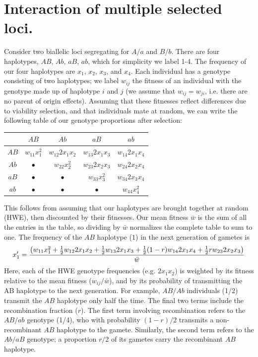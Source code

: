 \chapter{Interaction of multiple selected loci.}

Consider two biallelic loci segregating for $A/a$ and $B/b$. There are four haplotypes, $AB$, $Ab$, $aB$, $ab$, which for simplicity we label 1-4. The frequency of our four haplotypes are $x_1$, $x_2$, $x_3$, and $x_4$. Each individual has a genotype consisting of two haplotypes; we label $w_{ij}$ the fitness of an individual with the genotype made up of haplotype $i$ and $j$ (we assume that $w_{ij}=w_{ji}$, i.e. there are no parent of origin effects). Assuming that these fitnesses reflect differences due to viability selection, and that individuals mate at random, we can write the following table of our genotype proportions after selection:\\
\begin{center}
\begin{tabular}{c|cccc}
         & $AB$			& $Ab$				& $aB$				& $ab$\\
\hline
$AB$ & $w_{11} x_1^2$ 	& $w_{12} 2 x_1 x_2$  	& $w_{13} 2 x_1 x_3$ 	& $w_{14} 2 x_1 x_4$ \\
$Ab$ & $\bullet$ 	  	& $w_{22} x_2^2$ 	  	& $w_{23} 2 x_2 x_3$  	& $w_{24} 2 x_2 x_4$ \\  
$aB$ & $\bullet$ 		& $\bullet$ 			& $w_{33} x_3^2$ 	  	& $w_{34} 2 x_3 x_4$ \\  
$ab$ & $\bullet$ 		& $\bullet$			& $\bullet$ 			&  $w_{44} x_4^2$ \\
\end{tabular}
\end{center}
This follows from assuming that our haplotypes are brought together at random (HWE), then discounted by their fitnesses. Our mean fitness $\bar{w}$ is the sum of all the entries in the table, so dividing by $\bar{w}$ normalizes the complete table to sum to one. The frequency of the $AB$ haplotype ($1$) in the next generation of gametes is
\begin{equation}
x_1' = \frac{\big( w_{11} x_1^2 +	 \tfrac{1}{2} w_{12} 2 x_1 x_2  + \tfrac{1}{2} w_{13} 2x_1 x_3  +	 \tfrac{1}{2} (1-r) w_{14} 2 x_1 x_4 + \tfrac{1}{2} r w_{23} 2 x_2 x_3   \big)}{ \bar{w} } \label{eqn:hapfreq}
\end{equation}
Here, each of the HWE genotype frequencies (e.g. $2x_1x_2$) is weighted by its fitness relative to the mean fitness ($w_{ij}/\bar{w}$), and by its probability of transmitting the AB haplotype to the next generation. For example, $AB/Ab$ individuals (1/2) transmit the $AB$ haplotype only half the time. The final two terms include the recombination fraction ($r$). The first term involving recombination refers to the $AB/ab$ genotype (1/4), who with probability $(1-r)/2$ transmits a non-recombinant $AB$ haplotype to the gamete. Similarly, the second term refers to the  $Ab/aB$ genotype; a proportion $r/2$ of its gametes carry the recombinant $AB$ haplotype. 

